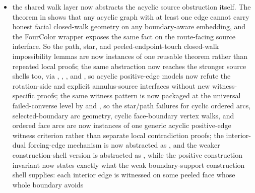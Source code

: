 \documentclass[11pt]{article}
\begin{document}
\begin{itemize}
lemma rather than the only place where the comparison is formalized;
\item the shared walk layer now abstracts the acyclic source obstruction
itself.  The theorem
in  shows that any acyclic
graph with at least one edge cannot carry honest facial closed-walk geometry
on any boundary-aware embedding, and the FourColor wrapper
exposes the same fact on the route-facing source interface.  So the path,
star, and peeled-endpoint-touch closed-walk impossibility lemmas are now
instances of one reusable theorem rather than repeated local proofs; the same
abstraction now reaches the stronger source shells too, via
,
,
,
and
,
so acyclic positive-edge models now refute the rotation-side and explicit
annulus-source interfaces without new witness-specific proofs;
the same witness pattern is now packaged at the universal failed-converse
level by
and
,
so the star/path failures for cyclic ordered arcs, selected-boundary arc
geometry, cyclic face-boundary vertex walks, and ordered face arcs are now
instances of one generic acyclic positive-edge witness criterion rather than
separate local contradiction proofs;
the interior-dual forcing-edge mechanism is now abstracted as
,
and the weaker construction-shell version is abstracted as
,
while the positive construction invariant
now states exactly what the weak boundary-support construction shell supplies:
each interior edge is witnessed on some peeled face whose whole boundary avoids

\end{itemize}
\end{document}
